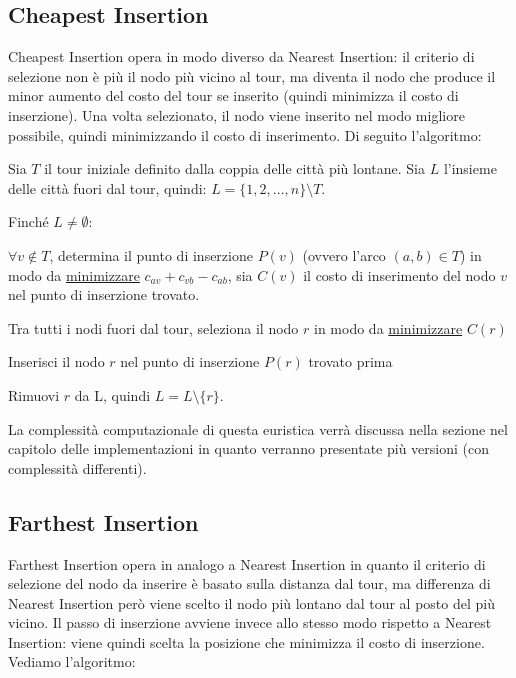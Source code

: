\documentclass[a4paper,12pt]{report}
\begin{document}
\subsection{Cheapest Insertion} \label{ssec:CI}
Cheapest Insertion opera in modo diverso da Nearest Insertion: il criterio di selezione non è più il nodo più vicino al tour, ma diventa il nodo che produce il minor aumento del costo del tour se inserito (quindi minimizza il costo di inserzione). Una volta selezionato, il nodo viene inserito nel modo migliore possibile, quindi minimizzando il costo di inserimento. Di seguito l'algoritmo:

\begin{tcolorbox}[colframe=black,colback=white,boxrule=0.5pt, sharp corners, breakable]
  \begin{legal}
    \item Sia $T$ il tour iniziale definito dalla coppia delle città più lontane. Sia $L$ l'insieme delle città fuori dal tour, quindi: $L = \{1, 2, ..., n\} \setminus T$.
    \item Finché $L \neq \emptyset$:
    \begin{legal}
      \item $\forall v \not \in T$, determina il punto di inserzione $P(v)$ (ovvero l'arco $(a, b) \in T$) in modo da \underline{minimizzare} $c_{av} + c_{vb} - c_{ab}$, sia $C(v)$ il costo di inserimento del nodo $v$ nel punto di inserzione trovato.
      \item Tra tutti i nodi fuori dal tour, seleziona il nodo $r$ in modo da \underline{minimizzare} $C(r)$
      \item Inserisci il nodo $r$ nel punto di inserzione $P(r)$ trovato prima
      \item Rimuovi $r$ da L, quindi $L = L \setminus \{r\}$.
    \end{legal}
  \end{legal}
  \end{tcolorbox}
\hfill \break La complessità computazionale di questa euristica verrà discussa nella sezione nel capitolo delle implementazioni in quanto verranno presentate più versioni (con complessità differenti).

\subsection{Farthest Insertion} \label{ssec:FaI}
Farthest Insertion opera in analogo a Nearest Insertion in quanto il criterio di selezione del nodo da inserire è basato sulla distanza dal tour, ma differenza di Nearest Insertion però viene scelto il nodo più lontano dal tour al posto del più vicino. Il passo di inserzione avviene invece allo stesso modo rispetto a Nearest Insertion: viene quindi scelta la posizione che minimizza il costo di inserzione. Vediamo l'algoritmo:
\end{document}
